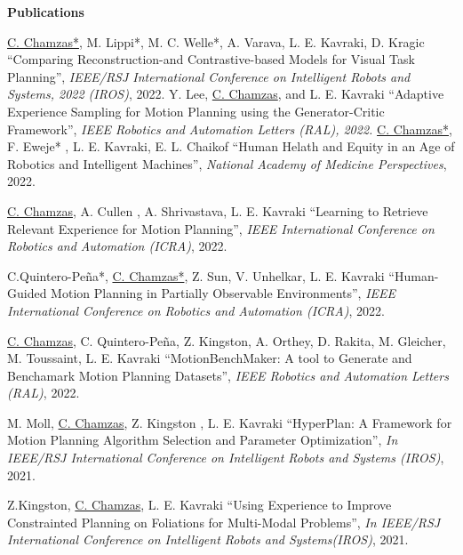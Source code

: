 \documentclass[letterpaper,11pt]{article}
\newcommand{\resheading}[1]{{\large \colorbox{mygrey}{\begin{minipage}{\textwidth}{\textbf{#1 \vphantom{p\^{E}}}}\end{minipage}}}}
\begin{document}
\resheading{Publications }
\begingroup
	\renewcommand{\section}[2]{}%
\begin{thebibliography}{9}
	\underline{C. Chamzas*}, M. Lippi*, M. C. Welle*, A. Varava, L. E. Kavraki, D. Kragic 
	``Comparing Reconstruction-and Contrastive-based Models for Visual Task Planning'',
	\textit{IEEE/RSJ International Conference on Intelligent Robots and Systems, 2022 (IROS)}, 2022.
	 Y. Lee, \underline{C. Chamzas}, and L. E. Kavraki 
	``Adaptive Experience Sampling for Motion Planning using the Generator-Critic Framework'',
	\textit{IEEE Robotics and Automation Letters (RAL), 2022.}
     \underline{C. Chamzas*}, F. Eweje* , L. E. Kavraki, E. L. Chaikof 
	``Human Helath and Equity in an Age of Robotics and Intelligent Machines'',
    \textit{National Academy of Medicine Perspectives}, 2022.

     \underline{C. Chamzas}, A. Cullen , A. Shrivastava, L. E. Kavraki
	``Learning to Retrieve Relevant Experience for Motion Planning'',
    \textit{IEEE International Conference on Robotics and Automation (ICRA)}, 2022.

     C.Quintero-Peña*, \underline{C. Chamzas*}, Z. Sun, V. Unhelkar, L. E. Kavraki
	``Human-Guided Motion Planning in Partially Observable Environments'',
    \textit{IEEE International Conference on Robotics and Automation (ICRA)}, 2022.

     \underline{C. Chamzas}, C. Quintero-Peña, Z. Kingston, A. Orthey, D. Rakita, M. Gleicher, M. Toussaint, L. E. Kavraki      ``MotionBenchMaker: A tool to Generate and Benchamark Motion Planning Datasets'',
     \textit{IEEE Robotics and Automation Letters (RAL)}, 2022.  

     M. Moll, \underline{C. Chamzas}, Z. Kingston , L. E. Kavraki
     ``HyperPlan: A Framework for Motion Planning Algorithm Selection and Parameter Optimization'',
     \textit{In IEEE/RSJ International Conference on Intelligent Robots and Systems (IROS)}, 2021.  

     Z.Kingston, \underline{C. Chamzas}, L. E. Kavraki
     ``Using Experience to Improve Constrainted Planning on Foliations for Multi-Modal Problems'',
     \textit{In IEEE/RSJ International Conference on Intelligent Robots and Systems(IROS)}, 2021.  


\end{thebibliography}
\end{document}
